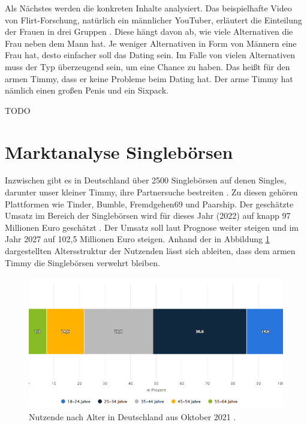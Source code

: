 Als Nächstes werden die konkreten Inhalte analysiert.
Das beispielhafte Video von \glqq Flirt-Forschung\grqq, natürlich ein männlicher YouTuber, erläutert die Einteilung der Frauen in drei Gruppen \cite{royalflushseduction}.
Diese hängt davon ab, wie viele Alternativen die Frau neben dem Mann hat.
Je weniger Alternativen in Form von Männern eine Frau hat, desto einfacher soll das Dating sein.
Im Falle von vielen Alternativen muss der Typ überzeugend sein, um eine Chance zu haben.
Das heißt für den armen Timmy, dass er keine Probleme beim Dating hat.
Der arme Timmy hat nämlich einen großen Penis und ein Sixpack.

TODO


\section{Marktanalyse Singlebörsen}

Inzwischen gibt es in Deutschland über 2500 Singlebörsen auf denen Singles, darunter unser kleiner Timmy, ihre Partnersuche bestreiten \cite{kundler}.
Zu diesen gehören Plattformen wie Tinder, Bumble, Fremdgehen69 und Paarship.
Der geschätzte Umsatz im Bereich der Singlebörsen wird für dieses Jahr (2022) auf knapp 97 Millionen Euro geschätzt \cite{statista}.
Der Umsatz soll laut Prognose weiter steigen und im Jahr 2027 auf 102,5 Millionen Euro steigen.
Anhand der in Abbildung \ref{fig:analyse-alter} dargestellten Altersstruktur der Nutzenden lässt sich ableiten, dass dem armen Timmy die Singlebörsen verwehrt bleiben.

\begin{figure}[h]
    \centering
    \includegraphics[scale=0.52]{Sources/alter.png}
    \caption{Nutzende nach Alter in Deutschland aus Oktober 2021 \cite{statista}.}
    \label{fig:analyse-alter}
\end{figure}

